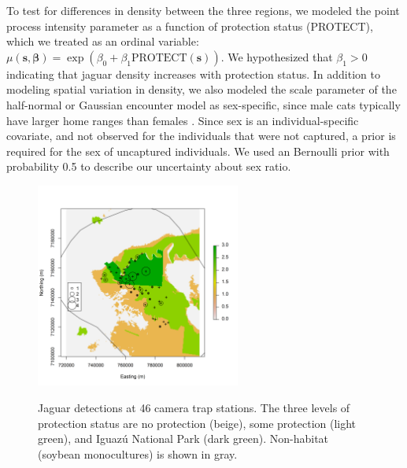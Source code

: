 To test for differences in
density between the three regions, we modeled the point process intensity parameter
as a function of protection status (PROTECT), which we treated as an
ordinal variable: $\mu(\mathbf{s}, \bm{\beta}) = \exp(\beta_0 +
\beta_1\text{PROTECT}(\mathbf{s}))$. We hypothesized that $\beta_1 > 0$
indicating that jaguar density increases with protection status. In
addition to modeling spatial variation in density, we also modeled the
scale parameter of the half-normal or Gaussian encounter model as
sex-specific, since male cats typically have larger home ranges than
females \citep{sollmann_etal:2011}. Since sex is an
individual-specific covariate, and not observed for the individuals
that were not captured, a prior is required for the sex of uncaptured
individuals. We used an Bernoulli prior with probability 0.5 to
describe our uncertainty about sex ratio.

\begin{figure}%
\centering
\includegraphics[width=0.6\textwidth]{Ch11/figs/jaguarCountMap}
\label{state-space.fig.jaguarCts}
\caption{Jaguar detections at 46 camera trap stations. The three levels of
  protection status are no protection (beige), some protection (light
  green), and Iguaz\'{u} National Park (dark green). Non-habitat
  (soybean monocultures) is shown in gray. }
\end{figure}

